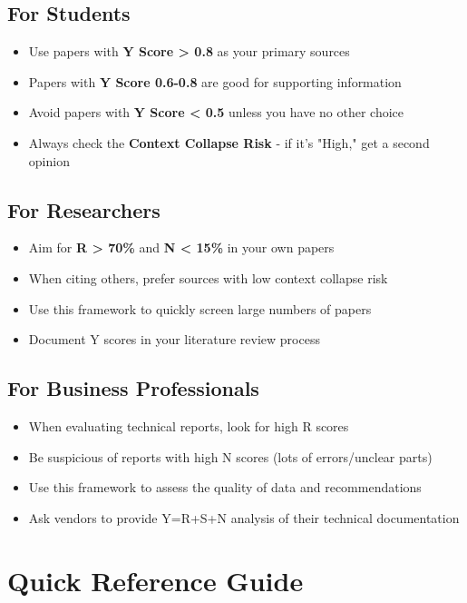 \documentclass[11pt,a4paper]{article}
\begin{document}
\subsection{For Students}
\begin{itemize}
\item Use papers with \textbf{Y Score > 0.8} as your primary sources
\item Papers with \textbf{Y Score 0.6-0.8} are good for supporting information
\item Avoid papers with \textbf{Y Score < 0.5} unless you have no other choice
\item Always check the \textbf{Context Collapse Risk} - if it's "High," get a second opinion
\end{itemize}

\subsection{For Researchers}
\begin{itemize}
\item Aim for \textbf{R > 70\%} and \textbf{N < 15\%} in your own papers
\item When citing others, prefer sources with low context collapse risk
\item Use this framework to quickly screen large numbers of papers
\item Document Y scores in your literature review process
\end{itemize}

\subsection{For Business Professionals}
\begin{itemize}
\item When evaluating technical reports, look for high R scores
\item Be suspicious of reports with high N scores (lots of errors/unclear parts)
\item Use this framework to assess the quality of data and recommendations
\item Ask vendors to provide Y=R+S+N analysis of their technical documentation
\end{itemize}

\section{Quick Reference Guide}
\end{document}
